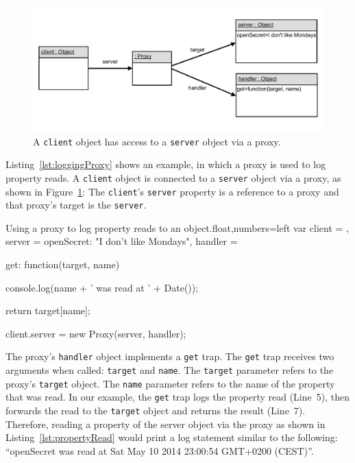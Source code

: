 \begin{figure}[h]
    \centering
    \includegraphics[width=\textwidth]{figures/5_implementation/1_loggingProxy.pdf}
    \caption{A \lstinline{client} object has access to a \lstinline{server} object via a proxy.}
    \label{fig:LoggingProxy}
\end{figure}

Listing~\ref{lst:loggingProxy} shows an example, in which a proxy is used to log property reads.
A \lstinline{client} object is connected to a \lstinline{server} object via a proxy, as shown in Figure~\ref{fig:LoggingProxy}:
The \lstinline{client}'s \lstinline{server} property is a reference to a proxy and that proxy's target is the \lstinline{server}.

\begin{code}{Using a proxy to log property reads to an object.}{float,numbers=left}
var client = {},
    server = {openSecret: "I don't like Mondays"},
    handler = {
        get: function(target, name) {
            console.log(name + ' was read at ' + Date());
            
            return target[name];
        }
    }

client.server = new Proxy(server, handler);
\end{code}
\iffalse
\end{verbatim}\fi

The proxy's \lstinline{handler} object implements a \lstinline{get} trap.
The \lstinline{get} trap receives two arguments when called: \lstinline{target} and \lstinline{name}.
The \lstinline{target} parameter refers to the proxy's \lstinline{target} object.
The \lstinline{name} parameter refers to the name of the property that was read.
In our example, the \lstinline{get} trap logs the property read (Line~5), then forwards the read to the \lstinline{target} object and returns the result (Line~7).
Therefore, reading a property of the server object via the proxy as shown in Listing~\ref{lst:propertyRead} would print a log statement similar to the following: ``openSecret was read at Sat May 10 2014 23:00:54 GMT+0200 (CEST)''.

